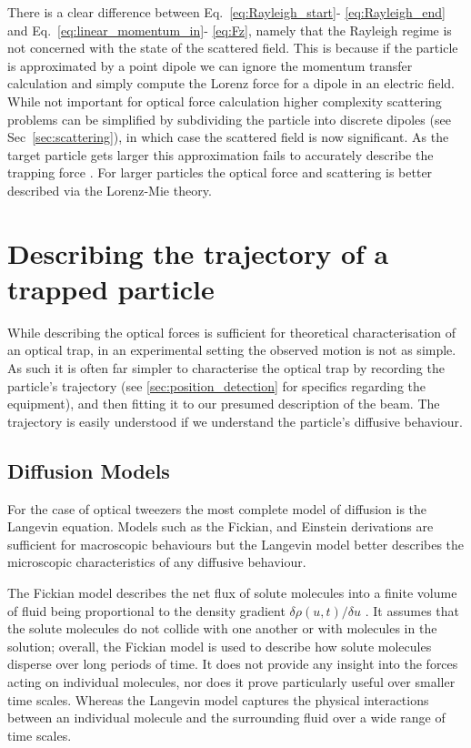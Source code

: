 There is a clear difference between Eq.~\eqref{eq:Rayleigh_start}-
\eqref{eq:Rayleigh_end} and Eq.~\eqref{eq:linear_momentum_in}- 
\eqref{eq:Fz}, namely that the Rayleigh regime is not concerned with 
the state of the scattered field. This is because if the particle 
is approximated by a point dipole we can ignore the momentum 
transfer calculation and simply compute the Lorenz force for a 
dipole in an electric field. While not important for optical force 
calculation higher complexity scattering problems can be simplified 
by subdividing the particle into discrete dipoles (see Sec~\ref{sec:scattering}), 
in which case the scattered field is now significant. As the 
target particle gets larger this approximation fails to accurately 
describe the trapping force \cite{Li2021}. For larger particles 
the optical force and scattering is better described via the 
Lorenz-Mie theory. 

\section{Describing the trajectory of a trapped particle}
While describing the optical forces is sufficient for 
theoretical characterisation of an optical trap, in an 
experimental setting the observed motion is not as 
simple. As such it is often far simpler to characterise 
the optical trap by recording the particle's trajectory 
(see \ref{sec:position_detection} for specifics 
regarding the equipment), and then fitting it to our 
presumed description of the beam. The trajectory is 
easily understood if we understand the particle's 
diffusive behaviour. 



\subsection{Diffusion Models}
For the case of optical tweezers the most complete model of 
diffusion is the Langevin equation. Models such as the Fickian, 
and Einstein derivations are sufficient for macroscopic 
behaviours but the Langevin model better describes the 
microscopic characteristics of any diffusive behaviour.
 
The Fickian model describes the net flux of solute molecules 
into a finite volume of fluid being proportional to the 
density gradient $\delta\rho(u,t)/\delta u$ \cite{Gillespie2012}. 
It assumes that the solute molecules do not collide with one 
another or with molecules in the solution; overall, the Fickian 
model is used to describe how solute molecules disperse over 
long periods of time. It does not provide any insight into 
the forces acting on individual molecules, nor does it prove 
particularly useful over smaller time scales. Whereas the Langevin 
model captures the physical interactions between an individual 
molecule and the surrounding fluid over a wide range of time 
scales.

